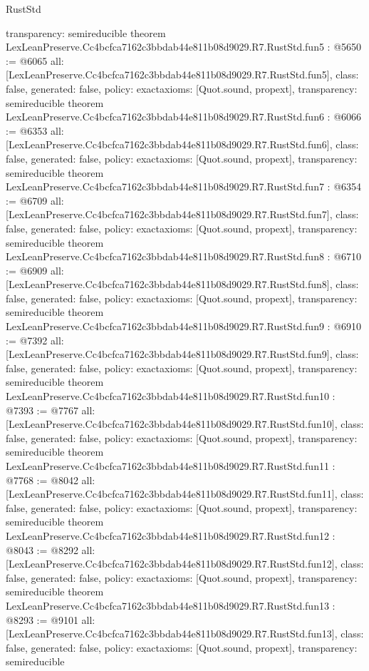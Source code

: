 \begin{lexlean}{RustStd}
\begin{coremodule}
{  transparency: semireducible
}
theorem LexLeanPreserve.Cc4bcfca7162c3bbdab44e811b08d9029.R7.RustStd.fun5 : @5650 := @6065 {
  all: [LexLeanPreserve.Cc4bcfca7162c3bbdab44e811b08d9029.R7.RustStd.fun5],
  class: false,
  generated: false,
  policy: exact{axioms: [Quot.sound, propext]},
  transparency: semireducible
}
theorem LexLeanPreserve.Cc4bcfca7162c3bbdab44e811b08d9029.R7.RustStd.fun6 : @6066 := @6353 {
  all: [LexLeanPreserve.Cc4bcfca7162c3bbdab44e811b08d9029.R7.RustStd.fun6],
  class: false,
  generated: false,
  policy: exact{axioms: [Quot.sound, propext]},
  transparency: semireducible
}
theorem LexLeanPreserve.Cc4bcfca7162c3bbdab44e811b08d9029.R7.RustStd.fun7 : @6354 := @6709 {
  all: [LexLeanPreserve.Cc4bcfca7162c3bbdab44e811b08d9029.R7.RustStd.fun7],
  class: false,
  generated: false,
  policy: exact{axioms: [Quot.sound, propext]},
  transparency: semireducible
}
theorem LexLeanPreserve.Cc4bcfca7162c3bbdab44e811b08d9029.R7.RustStd.fun8 : @6710 := @6909 {
  all: [LexLeanPreserve.Cc4bcfca7162c3bbdab44e811b08d9029.R7.RustStd.fun8],
  class: false,
  generated: false,
  policy: exact{axioms: [Quot.sound, propext]},
  transparency: semireducible
}
theorem LexLeanPreserve.Cc4bcfca7162c3bbdab44e811b08d9029.R7.RustStd.fun9 : @6910 := @7392 {
  all: [LexLeanPreserve.Cc4bcfca7162c3bbdab44e811b08d9029.R7.RustStd.fun9],
  class: false,
  generated: false,
  policy: exact{axioms: [Quot.sound, propext]},
  transparency: semireducible
}
theorem LexLeanPreserve.Cc4bcfca7162c3bbdab44e811b08d9029.R7.RustStd.fun10 : @7393 := @7767 {
  all: [LexLeanPreserve.Cc4bcfca7162c3bbdab44e811b08d9029.R7.RustStd.fun10],
  class: false,
  generated: false,
  policy: exact{axioms: [Quot.sound, propext]},
  transparency: semireducible
}
theorem LexLeanPreserve.Cc4bcfca7162c3bbdab44e811b08d9029.R7.RustStd.fun11 : @7768 := @8042 {
  all: [LexLeanPreserve.Cc4bcfca7162c3bbdab44e811b08d9029.R7.RustStd.fun11],
  class: false,
  generated: false,
  policy: exact{axioms: [Quot.sound, propext]},
  transparency: semireducible
}
theorem LexLeanPreserve.Cc4bcfca7162c3bbdab44e811b08d9029.R7.RustStd.fun12 : @8043 := @8292 {
  all: [LexLeanPreserve.Cc4bcfca7162c3bbdab44e811b08d9029.R7.RustStd.fun12],
  class: false,
  generated: false,
  policy: exact{axioms: [Quot.sound, propext]},
  transparency: semireducible
}
theorem LexLeanPreserve.Cc4bcfca7162c3bbdab44e811b08d9029.R7.RustStd.fun13 : @8293 := @9101 {
  all: [LexLeanPreserve.Cc4bcfca7162c3bbdab44e811b08d9029.R7.RustStd.fun13],
  class: false,
  generated: false,
  policy: exact{axioms: [Quot.sound, propext]},
  transparency: semireducible
}
\end{coremodule}
\end{lexlean}
